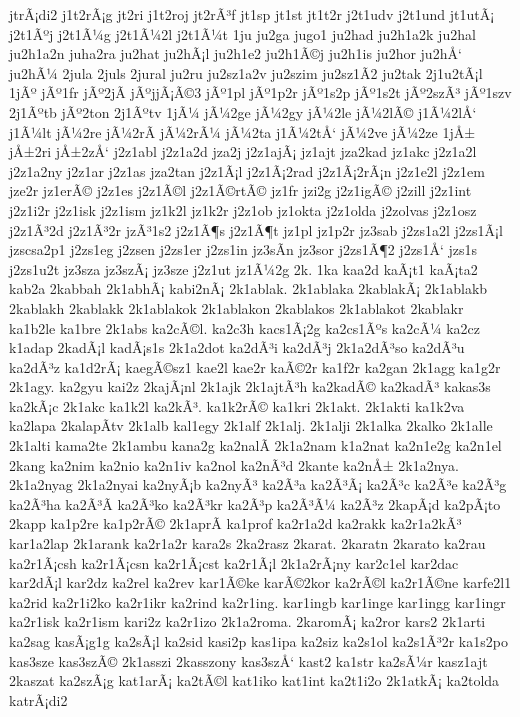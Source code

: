 {jtrÃ¡di2
j1t2rÃ¡g
jt2ri
j1t2roj
jt2rÃ³f
jt1sp
jt1st
jt1t2r
j2t1udv
j2t1und
jt1utÃ¡
j2t1Ãºj
j2t1Ã¼g
j2t1Ã¼2l
j2t1Ã¼t
1ju
ju2ga
jugo1
ju2had
ju2h1a2k
ju2hal
ju2h1a2n
juha2ra
ju2hat
ju2hÃ¡l
ju2h1e2
ju2h1Ã©j
ju2h1is
ju2hor
ju2hÅ‘
ju2hÃ¼
2jula
2juls
2jural
ju2ru
ju2sz1a2v
ju2szim
ju2sz1Ã­2
ju2tak
2j1u2tÃ¡l
1jÃº
jÃº1fr
jÃº2jÃ­
jÃºjjÃ¡Ã©3
jÃº1pl
jÃº1p2r
jÃº1s2p
jÃº1s2t
jÃº2szÃ³
jÃº1szv
2j1Ãºtb
jÃº2ton
2j1Ãºtv
1jÃ¼
jÃ¼2ge
jÃ¼2gy
jÃ¼2le
jÃ¼2lÃ©
j1Ã¼2lÅ‘
j1Ã¼lt
jÃ¼2re
jÃ¼2rÃ­
jÃ¼2rÃ¼
jÃ¼2ta
j1Ã¼2tÅ‘
jÃ¼2ve
jÃ¼2ze
1jÅ±
jÅ±2ri
jÅ±2zÅ‘
j2z1abl
j2z1a2d
jza2j
j2z1ajÃ¡
jz1ajt
jza2kad
jz1akc
j2z1a2l
j2z1a2ny
j2z1ar
j2z1as
jza2tan
j2z1Ã¡l
j2z1Ã¡2rad
j2z1Ã¡2rÃ¡n
j2z1e2l
j2z1em
jze2r
jz1erÃ©
j2z1es
j2z1Ã©l
j2z1Ã©rtÃ©
jz1fr
jzi2g
j2z1igÃ©
j2zill
j2z1int
j2z1i2r
j2z1isk
j2z1ism
jz1k2l
jz1k2r
j2z1ob
jz1okta
j2z1olda
j2zolvas
j2z1osz
j2z1Ã³2d
j2z1Ã³2r
jzÃ³1s2
j2z1Ã¶s
j2z1Ã¶t
jz1pl
jz1p2r
jz3sab
j2zs1a2l
j2zs1Ã¡l
jzscsa2p1
j2zs1eg
j2zsen
j2zs1er
j2zs1in
jz3sÃ­n
jz3sor
j2zs1Ã¶2
j2zs1Å‘
jzs1s
j2zs1u2t
jz3sza
jz3szÃ¡
jz3sze
j2z1ut
jz1Ã¼2g
2k.
1ka
kaa2d
kaÃ¡t1
kaÃ¡ta2
kab2a
2kabbah
2k1abhÃ¡
kabi2nÃ¡
2k1ablak.
2k1ablaka
2kablakÃ¡
2k1ablakb
2kablakh
2kablakk
2k1ablakok
2k1ablakon
2kablakos
2k1ablakot
2kablakr
ka1b2le
ka1bre
2k1abs
ka2cÃ©l.
ka2c3h
kacs1Ã¡2g
ka2cs1Ãºs
ka2cÃ¼
ka2cz
k1adap
2kadÃ¡l
kadÃ¡s1s
2k1a2dot
ka2dÃ³i
ka2dÃ³j
2k1a2dÃ³so
ka2dÃ³u
ka2dÃ³z
ka1d2rÃ¡
kaegÃ©sz1
kae2l
kae2r
kaÃ©2r
ka1f2r
ka2gan
2k1agg
ka1g2r
2k1agy.
ka2gyu
kai2z
2kajÃ¡nl
2k1ajk
2k1ajtÃ³h
ka2kadÃ©
ka2kadÃ³
kakas3s
ka2kÃ¡c
2k1akc
ka1k2l
ka2kÃ³.
ka1k2rÃ©
ka1kri
2k1akt.
2k1akti
ka1k2va
ka2lapa
2kalapÃ­tv
2k1alb
kal1egy
2k1alf
2k1alj.
2k1alji
2k1alka
2kalko
2k1alle
2k1alti
kama2te
2k1ambu
kana2g
ka2nalÃ­
2k1a2nam
k1a2nat
ka2n1e2g
ka2n1el
2kang
ka2nim
ka2nio
ka2n1iv
ka2nol
ka2nÃ³d
2kante
ka2nÅ±
2k1a2nya.
2k1a2nyag
2k1a2nyai
ka2nyÃ¡b
ka2nyÃ³
ka2Ã³a
ka2Ã³Ã¡
ka2Ã³c
ka2Ã³e
ka2Ã³g
ka2Ã³ha
ka2Ã³Ã­
ka2Ã³ko
ka2Ã³kr
ka2Ã³p
ka2Ã³Ã¼
ka2Ã³z
2kapÃ¡d
ka2pÃ¡to
2kapp
ka1p2re
ka1p2rÃ©
2k1aprÃ­
ka1prof
ka2r1a2d
ka2rakk
ka2r1a2kÃ³
kar1a2lap
2k1arank
ka2r1a2r
kara2s
2ka2rasz
2karat.
2karatn
2karato
ka2rau
ka2r1Ã¡csh
ka2r1Ã¡csn
ka2r1Ã¡cst
ka2r1Ã¡l
2k1a2rÃ¡ny
kar2c1el
kar2dac
kar2dÃ¡l
kar2dz
ka2rel
ka2rev
kar1Ã©ke
karÃ©2kor
ka2rÃ©l
ka2r1Ã©ne
karfe2l1
ka2rid
ka2r1i2ko
ka2r1ikr
ka2rind
ka2r1ing.
kar1ingb
kar1inge
kar1ingg
kar1ingr
ka2r1isk
ka2r1ism
kari2z
ka2r1izo
2k1a2roma.
2karomÃ¡
ka2ror
kars2
2k1arti
ka2sag
kasÃ¡g1g
ka2sÃ¡l
ka2sid
kasi2p
kas1ipa
ka2siz
ka2s1ol
ka2s1Ã³2r
ka1s2po
kas3sze
kas3szÃ©
2k1asszi
2kasszony
kas3szÅ‘
kast2
ka1str
ka2sÃ¼r
kasz1ajt
2kaszat
ka2szÃ¡g
kat1arÃ¡
ka2tÃ©l
kat1iko
kat1int
ka2t1i2o
2k1atkÃ¡
ka2tolda
katrÃ¡di2
}
